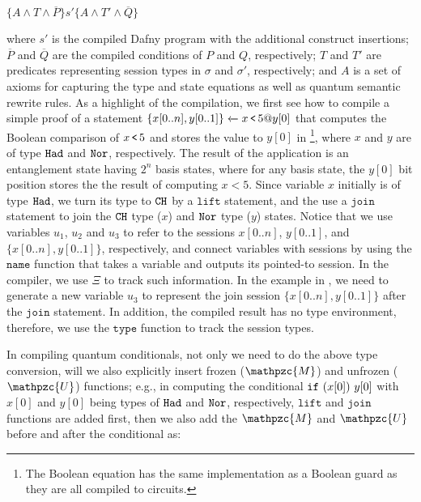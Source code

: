 {\small
\begin{center}
$\{A\wedge T\wedge \overline{P}\} s' \{A\wedge T'\wedge \overline{Q}\}$
\end{center}
}

where $s'$ is the compiled Dafny program with the additional construct insertions; $\overline{P}$ and $\overline{Q}$ are the compiled conditions of $P$ and $Q$, respectively; $T$ and $T'$ are predicates representing session types in $\sigma$ and $\sigma'$, respectively; and $A$ is a set of axioms for capturing the type and state equations as well as quantum semantic rewrite rules.
As a highlight of the compilation, we first see how to compile a simple proof of a statement ${\{x[0..n],y[0..1]\}} \xleftarrow{} {x\,\texttt{<}\,5@y[0]}$ that computes the Boolean comparison of $x\,\texttt{<}\,5$ and stores the value to $y[0]$ in  \footnote{The Boolean equation has the same implementation as a \qafny Boolean guard as they are all compiled to \oqasm circuits.},
where $x$ and $y$ are of type $\texttt{Had}$ and $\texttt{Nor}$, respectively. The result of the application is an entanglement state having $2^n$ basis states, where for any basis state, the $y[0]$ bit position stores the the result of computing $x<5$.
Since variable $x$ initially is of type $\texttt{Had}$, we turn its type to $\texttt{CH}$ by a $\texttt{lift}$ statement, and the use a $\texttt{join}$ statement to join the $\texttt{CH}$ type ($x$) and $\texttt{Nor}$ type ($y$) states.
Notice that we use variables $u_1$, $u_2$ and $u_3$ to refer to the sessions $x[0..n]$, $y[0..1]$, and $\{x[0..n],y[0..1]\}$, respectively, and connect variables with sessions by using the $\texttt{name}$ function that takes a variable and outputs its pointed-to session. In the \qafny compiler, we use $\Xi$ to track such information. In the example in , we need to generate a new variable $u_3$ to represent the join session $\{x[0..n],y[0..1]\}$ after the $\texttt{join}$ statement. 
In addition, the compiled result has no type environment, therefore, we use the $\texttt{type}$ function to track the session types.

In compiling quantum conditionals, not only we need to do the above type conversion, will we also explicitly insert frozen ($\mathpzc{M}$) and unfrozen ($\mathpzc{U}$) functions; e.g., in computing the conditional $\texttt{if}~{(x[0])}~{y[0]}$ with $x[0]$ and $y[0]$ being types of $\texttt{Had}$ and $\texttt{Nor}$, respectively, $\texttt{lift}$ and $\texttt{join}$ functions are added first, then we also add the $\mathpzc{M}$ and $\mathpzc{U}$ before and after the conditional as:


